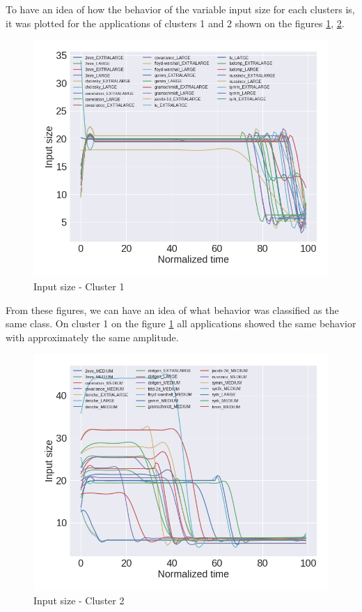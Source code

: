 To have an idea of how the behavior of the variable input size for each clusters is, it was plotted for the applications of clusters 1 and 2 shown on the figures \ref{fig:c1_input_size_0}, \ref{fig:c1_input_size_1}.

\begin{figure}[H]
	\centering
	\includegraphics[width=\textwidth]{fingerprint/figures/cluster_input_0.png}
	\caption{Input size - Cluster 1}
	\label{fig:c1_input_size_0}
\end{figure}

From these figures, we can have an idea of what behavior was classified as the same class. On cluster 1 on the figure \ref{fig:c1_input_size_0} all applications showed the same behavior with approximately the same amplitude.

\begin{figure}[H]
	\centering
	\includegraphics[width=\textwidth]{fingerprint/figures/cluster_input_1.png}
	\caption{Input size - Cluster 2}
	\label{fig:c1_input_size_1}
\end{figure}

